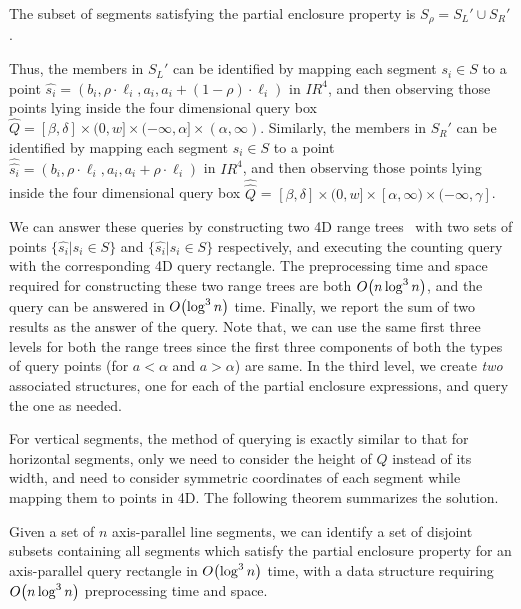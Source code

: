 \begin{observation}
The subset of segments satisfying the partial enclosure property is 
$S_\rho = S_L' \cup S_R'$. 
\end{observation}

Thus, the members in $S_L'$ can be identified by mapping each 
segment $s_i\in S$ to a point $\hat{s_i}=(b_i,\rho\cdot\ell_i,
a_i,a_i + (1-\rho) \cdot\ell_i)$ in $I\!\!R^4$, and then observing  
those points lying inside the  four dimensional query box 
$\hat{Q}=[\beta, \delta] \times (0,w] \times (-\infty,\alpha] \times 
(\alpha,\infty)$. 
Similarly, the members in $S_R'$ can be identified 
by mapping each segment $s_i\in S$ to a point 
$\hat{\hat{s_i}}=(b_i,\rho\cdot\ell_i,a_i,a_i + \rho 
\cdot\ell_i)$ in $I\!\!R^4$, and then observing  
those points lying inside the  four dimensional query box 
$\hat{\hat{Q}}$ = $[\beta, \delta] \times (0, w] \times [\alpha, \infty) 
\times (-\infty, \gamma]$.

We can answer these queries by constructing two 4D range 
trees~\cite{Deberg} with two sets of points $\{\hat{s_i}|s_i 
\in S\}$ and $\{\hat{s_i}|s_i \in S\}$ respectively, and 
executing the counting query with the corresponding 4D query 
rectangle. The preprocessing time and space required for 
constructing these two range trees are both $O\!\left(n \log^3{n}\right)$, 
and the query can be answered in $O\!\left(\log^3{n}\right)$ time. Finally, 
we report the sum of two results as the answer of the query. 
Note that, we can use the same first three levels for both the 
range trees since the first three components of both the types 
of query points (for $a<\alpha$ and $a > \alpha$) are same. In the  
third level, we create \emph{two} associated structures, one for 
each of the partial enclosure expressions, and query the one as 
needed. 

For vertical segments, the method of querying is exactly similar 
to that for horizontal segments, only we need to consider the 
height of $Q$ instead of its width, and need to consider symmetric 
coordinates of each segment while mapping them to points in 4D. 
The following theorem summarizes the solution.

\begin{theorem}
\label{th:ap}
Given a set of $n$ axis-parallel line segments, we can identify a 
set of disjoint subsets containing all segments which satisfy the partial 
enclosure property for an axis-parallel query rectangle in $O\!\left(\log^3{n}\right)$ 
time,
with a data structure requiring $O\!\left(n\log^3{n}\right)$ preprocessing time and 
space.
\end{theorem}

